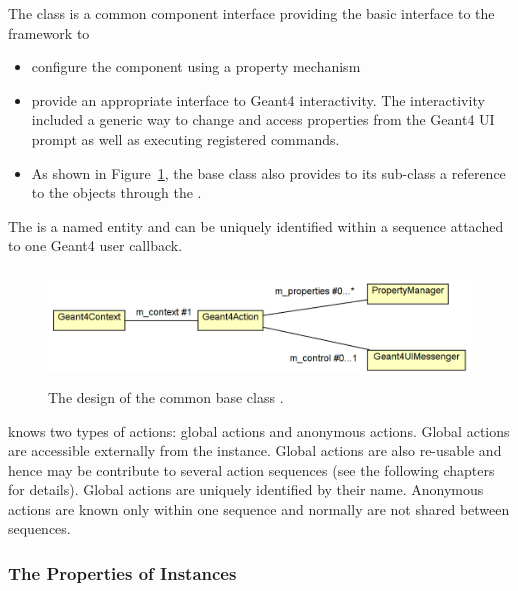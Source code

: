 \noindent
The class  is a common component interface providing 
the basic interface to the framework to
\begin{itemize}\itemcompact
\item configure the component using a property mechanism
\item provide an appropriate interface to Geant4 interactivity. The interactivity 
    included a generic way to change and access properties from the Geant4 UI 
    prompt as well as executing registered commands.
\item As shown in Figure~\ref{fig:ddg4-implementation-geant4-action}, the 
    base class also provides to its sub-class a reference to the 
    objects through the .
\end{itemize}
The  is a named entity and can be uniquely identified within
a sequence attached to one Geant4 user callback.
\begin{figure}[h]
  \begin{center}
    \includegraphics[height=30mm] {DDG4-Geant4Action.png}
    \caption{The design of the common base class .}
    \label{fig:ddg4-implementation-geant4-action}
  \end{center}
\end{figure}

\noindent
\DDG knows two types of actions: global actions and anonymous actions.
Global actions are accessible externally from the  instance.
Global actions are also re-usable and hence may be contribute to several 
action sequences (see the following chapters for details). Global actions 
are uniquely identified by their name.
Anonymous actions are known only within one sequence and normally
are not shared between sequences.

\subsubsection{The Properties of  Instances}
\label{sec:ddg4-implementation-geant4-action-properties}

